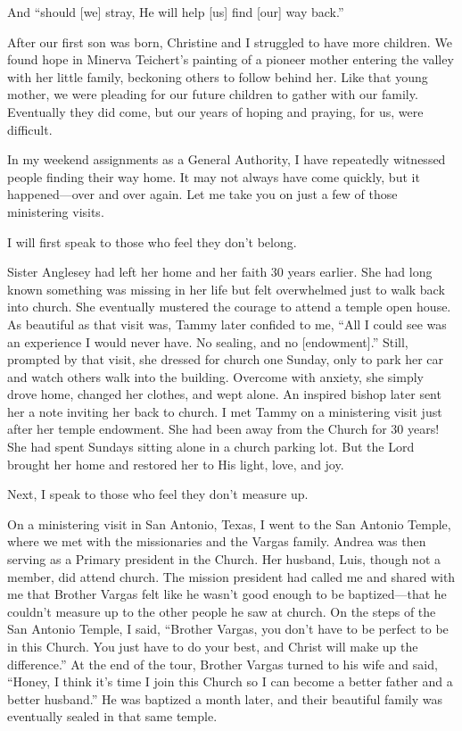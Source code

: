 \documentclass[letterpaper, 11pt]{report}
\newcommand{\intalkheader}[1]{
    \vspace{0.75em}
    \noindent{\normalsize\bfseries #1}
    \par\nopagebreak %
    \vspace{0.25em}
    \nopagebreak     %
}
\begin{document}
And “should [we] stray, He will help [us] find [our] way back.”

\intalkheader{God Is Calling Us Home}

After our first son was born, Christine and I struggled to have more children. We found hope in Minerva Teichert’s painting of a pioneer mother entering the valley with her little family, beckoning others to follow behind her. Like that young mother, we were pleading for our future children to gather with our family. Eventually they did come, but our years of hoping and praying, for us, were difficult.

In my weekend assignments as a General Authority, I have repeatedly witnessed people finding their way home. It may not always have come quickly, but it happened—over and over again. Let me take you on just a few of those ministering visits.

I will first speak to those who feel they don’t belong.

Sister Anglesey had left her home and her faith 30 years earlier. She had long known something was missing in her life but felt overwhelmed just to walk back into church. She eventually mustered the courage to attend a temple open house. As beautiful as that visit was, Tammy later confided to me, “All I could see was an experience I would never have. No sealing, and no [endowment].” Still, prompted by that visit, she dressed for church one Sunday, only to park her car and watch others walk into the building. Overcome with anxiety, she simply drove home, changed her clothes, and wept alone. An inspired bishop later sent her a note inviting her back to church. I met Tammy on a ministering visit just after her temple endowment. She had been away from the Church for 30 years! She had spent Sundays sitting alone in a church parking lot. But the Lord brought her home and restored her to His light, love, and joy.

Next, I speak to those who feel they don’t measure up.

On a ministering visit in San Antonio, Texas, I went to the San Antonio Temple, where we met with the missionaries and the Vargas family. Andrea was then serving as a Primary president in the Church. Her husband, Luis, though not a member, did attend church. The mission president had called me and shared with me that Brother Vargas felt like he wasn’t good enough to be baptized—that he couldn’t measure up to the other people he saw at church. On the steps of the San Antonio Temple, I said, “Brother Vargas, you don’t have to be perfect to be in this Church. You just have to do your best, and Christ will make up the difference.” At the end of the tour, Brother Vargas turned to his wife and said, “Honey, I think it’s time I join this Church so I can become a better father and a better husband.” He was baptized a month later, and their beautiful family was eventually sealed in that same temple.
\end{document}
